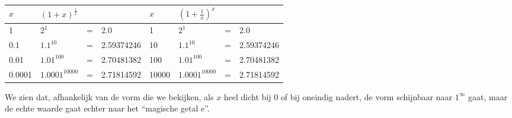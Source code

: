 \begin{table}[ht]
\centering
\begin{tabular}{|l|l|l|l||l|l|l|l|}
	\hline 
	$x$ & \multicolumn{3}{l||}{$\left(1+x\right)^{\frac{1}{x}}$}  & $x$ & \multicolumn{3}{l|}{$\left(1+\frac{1}{x}\right)^{x}$}\\
	\hline 
	\hline 
	1 & $2^{1}$ & = & 2.0  & 1 & $2^{1}$ & = & 2.0\\
	\hline 
	0.1 & $1.1^{10}$ & = & 2.59374246  & 10 & $1.1^{10}$ & = & 2.59374246\\
	\hline 
	0.01 & $1.01^{100}$ & = & 2.70481382  & 100 & $1.01^{100}$ & = & 2.70481382\\
	\hline 
	0.0001 & $1.0001^{10000}$ & = & 2.71814592  & 10000 & $1.0001^{10000}$ & = & 2.71814592\\
	\hline 
\end{tabular}
\end{table}
\medskip{}


\noindent We zien dat, afhankelijk van de vorm die we bekijken, als
$x$ heel dicht bij $0$ of bij oneindig nadert, de vorm schijnbaar
naar $1^{\infty}$ gaat, maar de echte waarde gaat echter naar het
``magische getal e''.

